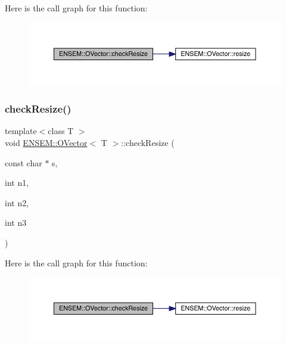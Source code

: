 Here is the call graph for this function\+:
\nopagebreak
\begin{figure}[H]
\begin{center}
\leavevmode
\includegraphics[width=350pt]{d0/d8d/classENSEM_1_1OVector_acd8960fbc5b7df8aabf14ca8ca50f7ab_cgraph}
\end{center}
\end{figure}
\mbox{\label{classENSEM_1_1OVector_ac909025f6c5d78479f5dcbef8151d571}} 
\subsubsection{\texorpdfstring{checkResize()}{checkResize()}\hspace{0.1cm}{\footnotesize\ttfamily [7/9]}}
{\footnotesize\ttfamily template$<$class T $>$ \\
void \mbox{\hyperlink{classENSEM_1_1OVector}{E\+N\+S\+E\+M\+::\+O\+Vector}}$<$ T $>$\+::check\+Resize (\begin{DoxyParamCaption}\item[{const char $\ast$}]{s,  }\item[{int}]{n1,  }\item[{int}]{n2,  }\item[{int}]{n3 }\end{DoxyParamCaption})\hspace{0.3cm}{\ttfamily [inline]}}

Here is the call graph for this function\+:
\nopagebreak
\begin{figure}[H]
\begin{center}
\leavevmode
\includegraphics[width=350pt]{d0/d8d/classENSEM_1_1OVector_ac909025f6c5d78479f5dcbef8151d571_cgraph}
\end{center}
\end{figure}
\mbox{\label{classENSEM_1_1OVector_ac909025f6c5d78479f5dcbef8151d571}} 
